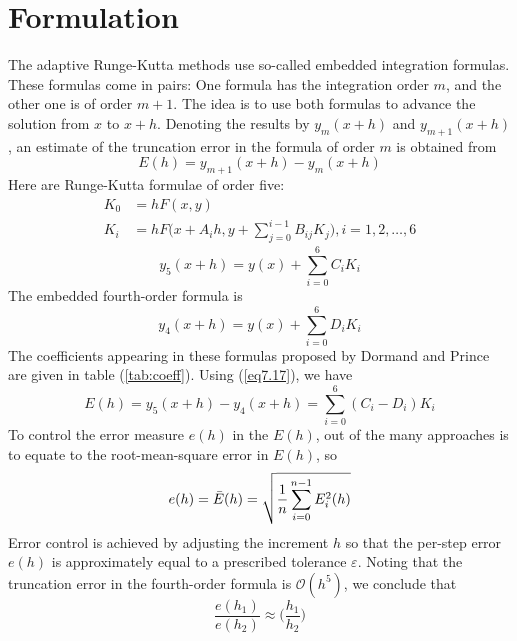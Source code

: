 \documentclass[12pt]{article}
\begin{document}
\section{Formulation}
The adaptive Runge-Kutta methods use so-called embedded integration formulas. These formulas come in pairs: One formula has the integration order $m$, and the other one is of order $m+1$. The idea is to use both formulas to advance the solution from $x$ to $x+h$. Denoting the results by $y_m(x+h)$ and $y_{m+1}(x+h)$, an estimate of the truncation error in the formula of order $m$ is obtained from
\begin{equation}
\label{eq7.17}
    E(h) = y_{m+1}(x+h) - y_m(x+h)
\end{equation}
Here are Runge-Kutta formulae of order five:
\begin{equation}
\label{eq7.18}
    \begin{split}
        K_0
        &= h F(x, y) \\
        K_i
        &= h F \Bigg( x+A_ih, y + \sum_{j = 0}^{i-1} B_{ij} K_j \Bigg), i = 1, 2, \ldots, 6
    \end{split}
\end{equation}
\begin{equation}
\label{eq7.19a}
    y_5 (x+h) = y(x) + \sum_{i=0}^6 C_i K_i
\end{equation}
The embedded fourth-order formula is
\begin{equation}
    y_4 (x+h) = y(x) + \sum_{i=0}^6 D_i K_i
\end{equation}
The coefficients appearing in these formulas proposed by Dormand and Prince are given in table (\ref{tab:coeff}). Using (\ref{eq7.17}), we have
\begin{equation}
    E(h) = y_5 (x+h) - y_4 (x+h) = \sum_{i=0}^6 (C_i - D_i)K_i
\end{equation}
To control the error measure $e(h)$ in the $E(h)$, out of the many approaches is to equate to the root-mean-square error in $E(h)$, so
\begin{equation}
    e(h) = \Bar{E}(h) = \sqrt{\dfrac{1}{n} \sum_{i=0}^{n-1} E_i^2 (h)}
\end{equation}
Error control is achieved by adjusting the increment $h$ so that the per-step error $e(h)$ is approximately equal to a prescribed tolerance $\varepsilon$. Noting that the truncation error in the fourth-order formula is $\mathcal{O} (h^5)$, we conclude that
\begin{equation}
\label{eq7.23}
    \dfrac{e(h_1)}{e(h_2)} \approx \Big( \dfrac{h_1}{h_2} \Big)
\end{equation}
\end{document}
